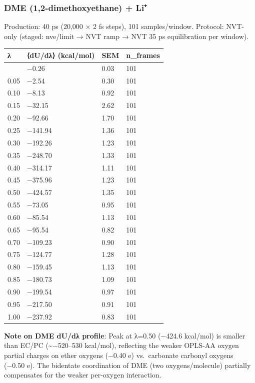 \documentclass[
  11pt,
]{article}
\newcounter{none} %
\begin{document}
\subsubsection{DME (1,2-dimethoxyethane) +
Li⁺}\label{dme-12-dimethoxyethane-li}

Production: 40 ps (20,000 × 2 fs steps), 101 samples/window. Protocol:
NVT-only (staged: nve/limit → NVT ramp → NVT 35 ps equilibration per
window).

{\def\LTcaptype{none} %
\begin{longtable}[]{@{}llll@{}}
\toprule\noalign{}
λ & ⟨dU/dλ⟩ (kcal/mol) & SEM & n\_frames \\
\midrule\noalign{}
\endhead
\bottomrule\noalign{}
\endlastfoot
0.00 & −0.26 & 0.03 & 101 \\
0.05 & −2.54 & 0.30 & 101 \\
0.10 & −8.13 & 0.92 & 101 \\
0.15 & −32.15 & 2.62 & 101 \\
0.20 & −92.66 & 1.70 & 101 \\
0.25 & −141.94 & 1.36 & 101 \\
0.30 & −192.26 & 1.23 & 101 \\
0.35 & −248.70 & 1.33 & 101 \\
0.40 & −314.17 & 1.11 & 101 \\
0.45 & −375.96 & 1.23 & 101 \\
0.50 & −424.57 & 1.35 & 101 \\
0.55 & −73.05 & 0.95 & 101 \\
0.60 & −85.54 & 1.13 & 101 \\
0.65 & −95.54 & 0.82 & 101 \\
0.70 & −109.23 & 0.90 & 101 \\
0.75 & −124.77 & 1.28 & 101 \\
0.80 & −159.45 & 1.13 & 101 \\
0.85 & −180.73 & 1.09 & 101 \\
0.90 & −199.54 & 0.97 & 101 \\
0.95 & −217.50 & 0.91 & 101 \\
1.00 & −237.92 & 0.83 & 101 \\
\end{longtable}
}

\textbf{Note on DME dU/dλ profile}: Peak at λ=0.50 (−424.6 kcal/mol) is
smaller than EC/PC (\textasciitilde−520--530 kcal/mol), reflecting the
weaker OPLS-AA oxygen partial charges on ether oxygens (−0.40 e)
vs.~carbonate carbonyl oxygens (−0.50 e). The bidentate coordination of
DME (two oxygens/molecule) partially compensates for the weaker
per-oxygen interaction.
\end{document}
